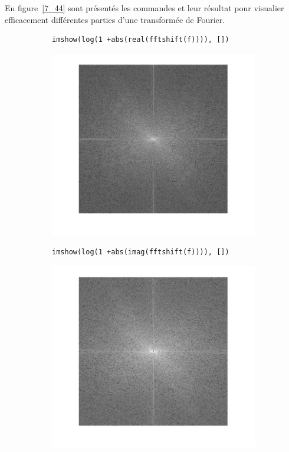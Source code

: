 \documentclass[12pt,a4paper,onecolumn]{article}
\begin{document}
En figure~\ref{7_44} sont présentés les commandes et leur résultat pour visualier efficacement différentes parties d'une transformée de Fourier.

\begin{figure}
	\centering
	\begin{subfigure}[b]{0.45\textwidth}
		\centering
		\begin{lstlisting}[frame = none, numbers = none]
imshow(log(1 +abs(real(fftshift(f)))), [])
		\end{lstlisting}
		\includegraphics[scale = 1, width = \textwidth]{7_41}
		\label{7_41}
	\end{subfigure}
	\begin{subfigure}[b]{0.45\textwidth}
		\centering
		\begin{lstlisting}[frame = none, numbers = none]
imshow(log(1 +abs(imag(fftshift(f)))), [])
		\end{lstlisting}
		\includegraphics[scale = 1, width = \textwidth]{7_42}

\end{subfigure}
\end{figure}
\end{document}
